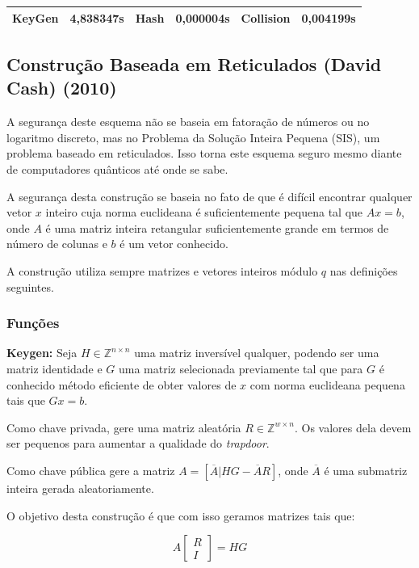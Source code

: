 \documentclass[a4paper]{article}
\begin{document}
\begin{center}
\begin{tabular}{|c|c|c|c|c|c|}
  \hline
  KeyGen & 4,838347s & Hash & 0,000004s & Collision & 0,004199s\\
  \hline
\end{tabular}
\end{center}


\subsection{Construção Baseada em Reticulados (David Cash)
  (2010)\cite{reticulado}}

A segurança deste esquema não se baseia em fatoração de números ou no
logaritmo discreto, mas no Problema da Solução Inteira Pequena (SIS),
um problema baseado em reticulados. Isso torna este esquema seguro
mesmo diante de computadores quânticos até onde se sabe.

A segurança desta construção se baseia no fato de que é difícil
encontrar qualquer vetor $x$ inteiro cuja norma euclideana é
suficientemente pequena tal que $Ax = b$, onde $A$ é uma matriz
inteira retangular suficientemente grande em termos de número de
colunas e $b$ é um vetor conhecido.

A construção utiliza sempre matrizes e vetores inteiros módulo $q$ nas
definições seguintes.

\subsubsection{Funções}

\textbf{Keygen:} Seja $H \in \mathbb{Z}^{n\times n}$ uma matriz
inversível qualquer, podendo ser uma matriz identidade e $G$ uma
matriz selecionada previamente tal que para $G$ é conhecido método
eficiente de obter valores de $x$ com norma euclideana pequena tais
que $Gx = b$.

Como chave privada, gere uma matriz aleatória $R \in \mathbb{Z}^{w
  \times n}$. Os valores dela devem ser pequenos para aumentar a
qualidade do \textit{trapdoor}.

Como chave pública gere a matriz $A=[\overline{A}|HG-\overline{A}R]$,
onde $\overline{A}$ é uma submatriz inteira gerada aleatoriamente.

O objetivo desta construção é que com isso geramos matrizes tais que:

$$
A\left[\begin{matrix}R\\I\end{matrix}\right] = HG
$$
\end{document}
